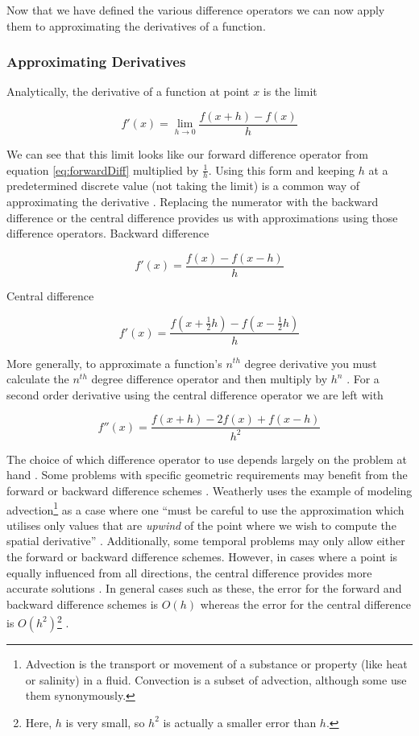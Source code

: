 \documentclass[authoryearcitations]{UoYCSproject}
\begin{document}
Now that we have defined the various difference operators 
we can now apply them to approximating the derivatives of a function. 

\subsubsection{Approximating Derivatives} 
Analytically, the derivative of a function at point $x$ is the limit

\begin{equation}
  f'(x) = \lim_{h\to0} \frac{f(x + h) - f(x)}{h} \nonumber
\end{equation}

We can see that this limit looks like our forward difference operator from equation \ref{eq:forwardDiff} multiplied
by $\frac{1}{h}$. Using this form and keeping $h$ at a predetermined discrete value (not taking the limit)
is a common way of approximating the derivative \cite{Hamming, wolfram, zhilin}. Replacing the numerator with
the backward difference or the central difference provides us with approximations using those difference operators. 
Backward difference

$$f'(x) = \frac{f(x) - f(x - h)}{h} $$

Central difference

$$f'(x) = \frac{f(x + \frac{1}{2}h) - f(x - \frac{1}{2}h)}{h} $$

More generally, to approximate a function's $n^{th}$ degree derivative you must calculate the $n^{th}$ degree
difference operator and then multiply by $h^n$ \cite{Hamming, weatherley4}. For a second order derivative using
the central difference operator we are left with

\begin{equation}
f''(x) = \frac{f(x + h) - 2f(x) + f(x - h)}{h^2}
\label{eq:2ndDegreeDiffOp}
\end{equation}

The choice of which difference operator to use depends largely on the problem at hand \cite{Hamming, weatherley}. 
Some problems with specific geometric requirements may benefit from the forward or backward difference schemes \cite{weatherley}.
Weatherly uses the example of modeling advection\footnote{Advection is the transport or movement of a substance or property
(like heat or salinity) in a fluid. Convection is a subset of advection, although some use them synonymously.} as a case
where one ``must be careful to use the approximation which utilises only values that are \emph{upwind} of the point where
we wish to compute the spatial derivative'' \cite{weatherley4}. Additionally, some temporal problems may only allow
either the forward or backward difference schemes. However, in cases where a point is equally influenced
from all directions, the central difference provides more accurate solutions \cite{Hamming, weatherley, weatherley4, analysis}.
In general cases such as these, the error for the forward and backward difference schemes is $O(h)$ whereas the error 
for the central difference is $O(h^2)$\footnote{Here, $h$ is very small, so $h^2$ is actually a smaller
error than $h$.} \cite{analysis, weatherley}. 
\end{document}

